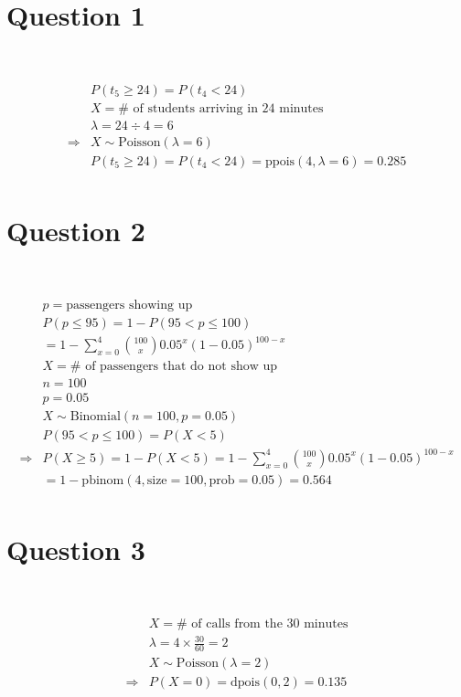 \documentclass{article}
\begin{document}
\section*{Question 1}

~

\begin{align*}
    &P(t_5\geqslant24)=P(t_4<24)\\
    &X=\#\text{ of students arriving in 24 minutes}\\
    &\lambda =24\div 4=6\\
    \Rightarrow&X\sim \text{Poisson}(\lambda =6)\\
    &P(t_5\geqslant 24)=P(t_4<24)=\text{ppois}(4,\lambda =6)=0.285\\
\end{align*}

\newpage

\section*{Question 2}

~

\begin{align*}
    &p=\text{passengers showing up}\\
    &P(p\leqslant 95)=1-P(95<p\leqslant 100)\\
    &=1-\sum_{x=0}^{4}\binom{100}{x}0.05^x(1-0.05)^{100-x}\\
    &X=\#\text{ of passengers that do not show up}\\
    &n=100\\
    &p=0.05\\
    &X\sim \text{Binomial}(n=100,p=0.05)\\
    &P(95<p\leqslant 100)=P(X<5)\\
    \Rightarrow&P(X\geqslant5)=1-P(X<5)=1-\sum_{x=0}^{4}\binom{100}{x}0.05^x(1-0.05)^{100-x}\\
    &=1-\text{pbinom}(4,\text{size}=100,\text{prob}=0.05)=0.564\\
\end{align*}

\newpage

\section*{Question 3}

~

\begin{align*}
    &X=\# \text{ of calls from the 30 minutes}\\
    &\lambda=4\times \frac{30}{60}=2\\
    &X\sim \text{Poisson}(\lambda =2)\\
    \Rightarrow&P(X=0)=\text{dpois}(0,2)=0.135\\
\end{align*}
\end{document}
